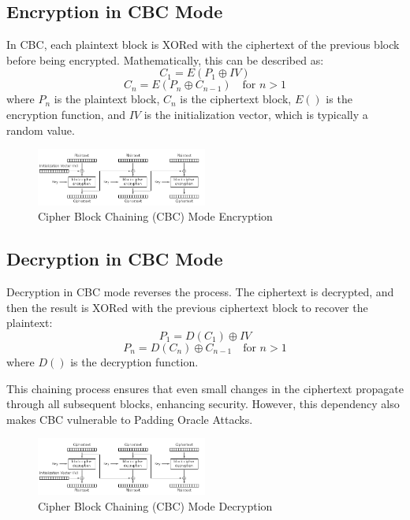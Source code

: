 \documentclass[conference]{IEEEtran}
\begin{document}
\subsection{Encryption in CBC Mode}
In CBC, each plaintext block is XORed with the ciphertext of the previous block before being encrypted. Mathematically, this can be described as:
\[
C_1 = E(P_1 \oplus IV)
\]
\[
C_n = E(P_n \oplus C_{n-1}) \quad \text{for } n > 1
\]
where \(P_n\) is the plaintext block, \(C_n\) is the ciphertext block, \(E()\) is the encryption function, and \(IV\) is the initialization vector, which is typically a random value.

\begin{figure}[!htb]
    \centering
    \includegraphics[width=0.5\textwidth]{CBC_encryption.png}
    \caption{Cipher Block Chaining (CBC) Mode Encryption}
    \label{fig:enter-label}
\end{figure}

\subsection{Decryption in CBC Mode}
Decryption in CBC mode reverses the process. The ciphertext is decrypted, and then the result is XORed with the previous ciphertext block to recover the plaintext:
\[
P_1 = D(C_1) \oplus IV
\]
\[
P_n = D(C_n) \oplus C_{n-1} \quad \text{for } n > 1
\]
where \(D()\) is the decryption function. 

This chaining process ensures that even small changes in the ciphertext propagate through all subsequent blocks, enhancing security. However, this dependency also makes CBC vulnerable to Padding Oracle Attacks.

\begin{figure}[!htb]
    \centering
    \includegraphics[width=0.5\textwidth]{CBC_decryption.png}
    \caption{Cipher Block Chaining (CBC) Mode Decryption}
    \label{fig:enter-label}
\end{figure}
\end{document}
